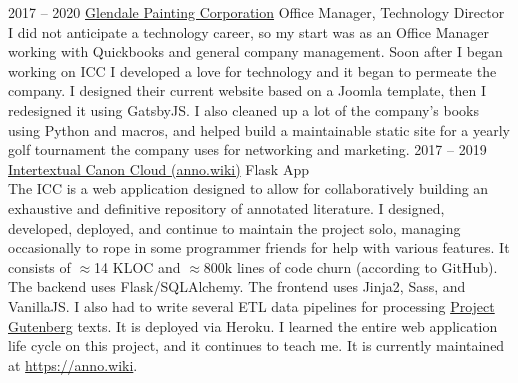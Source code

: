 \documentclass[9pt]{developercv} %
\begin{document}
\begin{entrylist}
{        }
    \entry
        {2017 -- 2020}
        {{\href{https://glendalepainting.com/}{Glendale Painting Corporation}}}
        {Office Manager, Technology Director}
        {
            \slashsep
            \slashsep
            \slashsep
            \slashsep
            \slashsep
            \slashsep
            \\
            I did not anticipate a technology career, so my start was as an
            Office Manager working with Quickbooks and general company
            management. Soon after I began working on ICC I developed a love for
            technology and it began to permeate the company. I designed their
            current website based on a Joomla template, then I redesigned it
            using GatsbyJS. I also cleaned up a lot of the company's books using
            Python and macros, and helped build a maintainable static site
            for a yearly golf tournament the company uses for networking and
            marketing.
        }
    \entry
        {2017 -- 2019}
        {{\href{https://github.com/Anno-Wiki/icc}{Intertextual Canon Cloud (anno.wiki)}}}
        {Flask App}
        {
            \slashsep
            \slashsep
            \slashsep
            \slashsep
            \slashsep
            \slashsep
            \\
            The ICC is a web application designed to allow for collaboratively
            building an exhaustive and definitive repository of annotated
            literature. I designed, developed, deployed, and continue to
            maintain the project solo, managing occasionally to rope in some
            programmer friends for help with various features. It consists of
            $\approx$14 KLOC and $\approx$800k lines of code churn (according
            to GitHub). The backend uses Flask/SQLAlchemy. The frontend uses
            Jinja2, Sass, and VanillaJS. I also had to write several ETL data
            pipelines for processing {\href{https://gutenberg.org}{Project
            Gutenberg}} texts.  It is deployed via Heroku. I learned the entire
            web application life cycle on this project, and it continues to
            teach me. It is currently maintained at
            {\href{https://anno.wiki}{https://anno.wiki}}.
        }
\end{entrylist}
\end{document}
